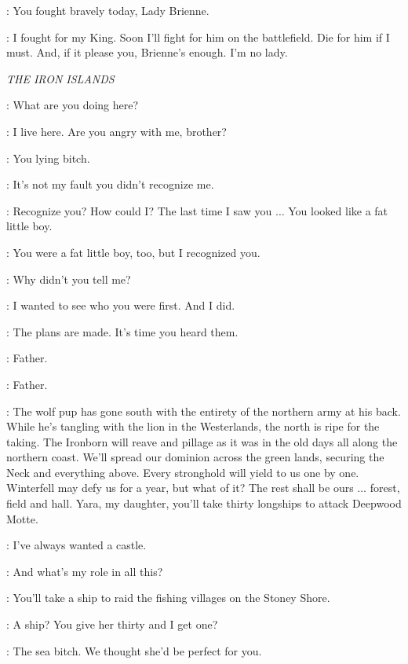 \CATELYN: You fought bravely today, Lady Brienne. 

\BRIENNE: I fought for my King. Soon I'll fight for him on the battlefield. Die for him if I must. And, if it please you, Brienne's enough. I'm no lady. 


\scene

\textit{THE IRON ISLANDS} 


\THEON: What are you doing here? 

\YARA: I live here. Are you angry with me, brother? 

\THEON: You lying bitch. 

\YARA: It's not my fault you didn't recognize me. 

\THEON: Recognize you? How could I? The last time I saw you $\ldots$ You looked like a fat little boy. 

\YARA: You were a fat little boy, too, but I recognized you. 

\THEON: Why didn't you tell me? 

\YARA: I wanted to see who you were first. And I did. 


\BALON: The plans are made. It's time you heard them. 

\YARA: Father. 

\THEON: Father. 

\BALON: The wolf pup has gone south with the entirety of the northern army at his back. While he's tangling with the lion in the Westerlands, the north is ripe for the taking. The Ironborn will reave and pillage as it was in the old days all along the northern coast. We'll spread our dominion across the green lands, securing the Neck and everything above. Every stronghold will yield to us one by one. Winterfell may defy us for a year, but what of it? The rest shall be ours $\ldots$ forest, field and hall. Yara, my daughter, you'll take thirty longships to attack Deepwood Motte. 

\YARA: I've always wanted a castle. 

\THEON: And what's my role in all this? 

\BALON: You'll take a ship to raid the fishing villages on the Stoney Shore. 

\THEON: A ship? You give her thirty and I get one? 

\YARA: The sea bitch. We thought she'd be perfect for you. 

